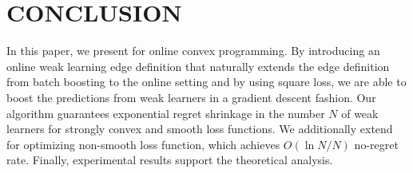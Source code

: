 







\section{CONCLUSION}
In this paper, we present \algshort for online convex programming. By introducing an online weak learning edge definition that naturally extends the edge definition from batch boosting to the online setting and by using square loss, we are able to boost the predictions from weak learners in a gradient descent fashion. Our \algshort algorithm guarantees exponential regret shrinkage in the number $N$ of weak learners for strongly convex and smooth loss functions. We additionally extend \algshort for optimizing non-smooth loss function, which achieves $O(\ln N/N)$ no-regret rate. Finally, experimental results support the theoretical analysis.

